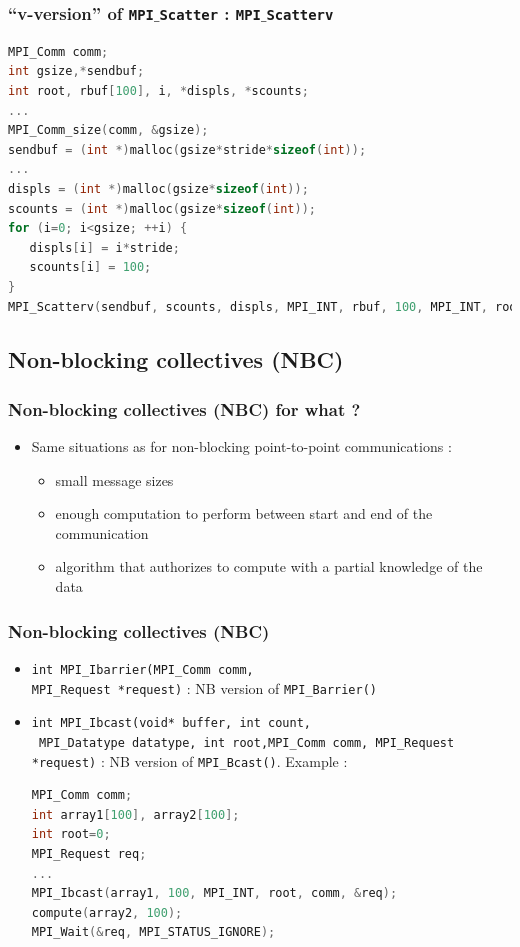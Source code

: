 \begin{frame}[containsverbatim]
\frametitle{``v-version'' of \texttt{MPI$\_$Scatter} : \texttt{MPI$\_$Scatterv}}
\begin{lstlisting}[language=C,frame=lines]
MPI_Comm comm;
int gsize,*sendbuf;
int root, rbuf[100], i, *displs, *scounts;
...
MPI_Comm_size(comm, &gsize);
sendbuf = (int *)malloc(gsize*stride*sizeof(int));
...
displs = (int *)malloc(gsize*sizeof(int));
scounts = (int *)malloc(gsize*sizeof(int));
for (i=0; i<gsize; ++i) {
   displs[i] = i*stride;
   scounts[i] = 100;
}
MPI_Scatterv(sendbuf, scounts, displs, MPI_INT, rbuf, 100, MPI_INT, root, comm);
\end{lstlisting}
\end{frame}




\subsection{Non-blocking collectives (NBC)}


\begin{frame}[containsverbatim]
\frametitle{Non-blocking collectives (NBC) for what ?}
\begin{itemize}
	\item{Same situations as for non-blocking point-to-point communications :
		\begin{itemize}
			\item {small message sizes}
			\item {enough computation to perform between start and end of the communication}
			\item {algorithm that authorizes to compute with a partial knowledge of the data}
		\end{itemize}
	}
\end{itemize}
\end{frame}

\begin{frame}[containsverbatim]
\frametitle{Non-blocking collectives (NBC)}
\begin{itemize}
	\item{\verb+int MPI_Ibarrier(MPI_Comm comm,+\\\verb+MPI_Request *request)+ : NB version of \verb+MPI_Barrier()+}
	\item{\verb+int MPI_Ibcast(void* buffer, int count,+\\\verb+ MPI_Datatype datatype, int root,MPI_Comm comm, MPI_Request *request)+ : NB version of \verb+MPI_Bcast()+. Example :

\begin{lstlisting}[language=C,frame=lines]
MPI_Comm comm;
int array1[100], array2[100];
int root=0;
MPI_Request req;
...
MPI_Ibcast(array1, 100, MPI_INT, root, comm, &req);
compute(array2, 100);
MPI_Wait(&req, MPI_STATUS_IGNORE);
\end{lstlisting}
	}
\end{itemize}
\end{frame}


